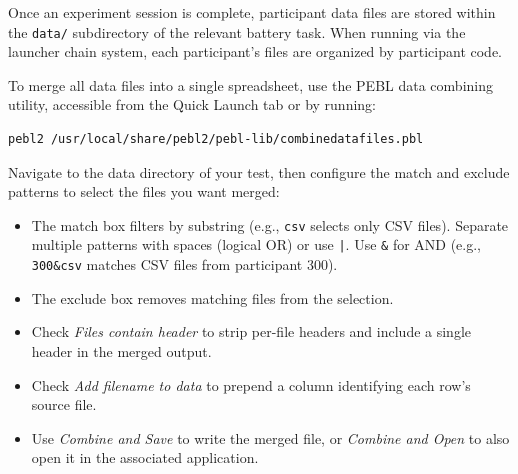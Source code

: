 
Once an experiment session is complete, participant data files are
stored within the \texttt{data/} subdirectory of the relevant battery
task.  When running via the launcher chain system, each participant's
files are organized by participant code.

To merge all data files into a single spreadsheet, use the PEBL data
combining utility, accessible from the Quick Launch tab or by running:
\begin{verbatim}
pebl2 /usr/local/share/pebl2/pebl-lib/combinedatafiles.pbl
\end{verbatim}

Navigate to the data directory of your test, then configure the match
and exclude patterns to select the files you want merged:

\begin{itemize}
  \item The match box filters by substring (e.g., \texttt{csv} selects
    only CSV files).  Separate multiple patterns with spaces (logical
    OR) or use \texttt{|}.  Use \texttt{\&} for AND (e.g.,
    \texttt{300\&csv} matches CSV files from participant 300).
  \item The exclude box removes matching files from the selection.
  \item Check \emph{Files contain header} to strip per-file headers and
    include a single header in the merged output.
  \item Check \emph{Add filename to data} to prepend a column
    identifying each row's source file.
  \item Use \emph{Combine and Save} to write the merged file, or
    \emph{Combine and Open} to also open it in the associated
    application.
\end{itemize}

